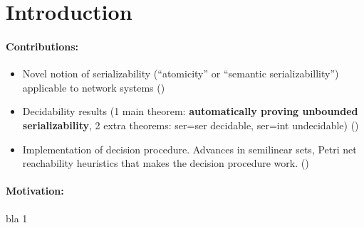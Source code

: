 \section{Introduction}
\label{sec:introduction}






\paragraph{Contributions:}
\begin{itemize}
    \item Novel notion of serializability (``atomicity'' or ``semantic serializabillity'') applicable to network systems ()
    \item Decidability results (1 main theorem: \textbf{automatically proving unbounded serializability}, 2 extra theorems: ser=ser decidable, ser=int undecidable) ()
    \item Implementation of decision procedure. Advances in semilinear sets, Petri net reachability heuristics that makes the decision procedure work. ()
\end{itemize}

\newpage


\paragraph{Motivation:}

bla 1

	
	
